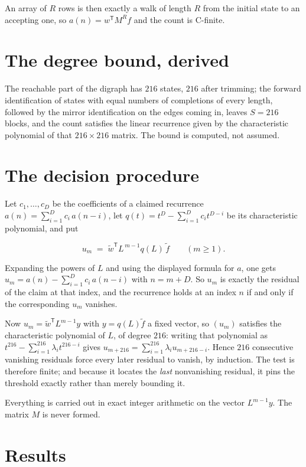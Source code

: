 \documentclass[11pt]{article}
\theoremstyle{definition}
\begin{document}
An array of $R$ rows is then exactly a walk of length $R$ from the initial state to an accepting one, so $a(n) = w^{\mathsf T}M^{R}f$ and the count is C-finite.

\section{The degree bound, derived}

The reachable part of the digraph has $216$ states, $216$ after trimming; the forward identification of states with equal numbers of completions of every length, followed by the mirror identification on the edges coming in, leaves $S = 216$ blocks, and the count satisfies the linear recurrence given by the characteristic polynomial of that $216\times216$ matrix. The bound is computed, not assumed.

\section{The decision procedure}

Let $c_1,\dots,c_D$ be the coefficients of a claimed recurrence $a(n) = \sum_{i=1}^{D} c_i\,a(n-i)$, let $q(t) = t^{D} - \sum_{i=1}^{D} c_i t^{D-i}$ be its characteristic polynomial, and put

\[u_m \;=\; \tilde w^{\mathsf T} L^{\,m-1} q(L)\,\tilde f \qquad (m \ge 1).\]

Expanding the powers of $L$ and using the displayed formula for $a$, one gets $u_m = a(n) - \sum_{i=1}^{D} c_i\,a(n-i)$ with $n = m + D$. So $u_m$ is exactly the residual of the claim at that index, and the recurrence holds at an index $n$ if and only if the corresponding $u_m$ vanishes.

Now $u_m = \tilde w^{\mathsf T} L^{m-1} y$ with $y = q(L)\tilde f$ a fixed vector, so $(u_m)$ satisfies the characteristic polynomial of $L$, of degree $216$: writing that polynomial as $t^{216} - \sum_{i=1}^{216} \lambda_i t^{216-i}$ gives $u_{m+216} = \sum_{i=1}^{216} \lambda_i u_{m+216-i}$. Hence $216$ consecutive vanishing residuals force every later residual to vanish, by induction. The test is therefore finite; and because it locates the {\itshape last} nonvanishing residual, it pins the threshold exactly rather than merely bounding it.

Everything is carried out in exact integer arithmetic on the vector $L^{m-1}y$. The matrix $M$ is never formed.

\section{Results}
\end{document}
